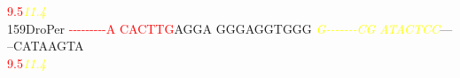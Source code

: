 \documentclass[11pt,twoside,reqno,a4paper]{article}
\begin{document}
{\hspace*{4\charwidth}\hspace*{7\charwidth}\hspace*{0\charwidth}\textcolor{red}{9.5}\hspace*{1\charwidth}\hspace*{1\charwidth}\hspace*{1\charwidth}\hspace*{27\charwidth}\textit{\textcolor{yellow}{11.4}}\hspace*{1\charwidth}\hspace*{1\charwidth}\hspace*{1\charwidth}\\
159\hspace*{1\charwidth}DroPer	\textcolor{red}{-}\textcolor{red}{-}\textcolor{red}{-}\textcolor{red}{-}\textcolor{red}{-}\textcolor{red}{-}\textcolor{red}{-}\textcolor{red}{-}\textcolor{red}{-}\textcolor{red}{A}	\textcolor{red}{C}\textcolor{red}{A}\textcolor{red}{C}\textcolor{red}{T}\textcolor{red}{T}\textcolor{red}{G}AGGA	GGGAGGTGGG	\textit{\textcolor{yellow}{G}}\textit{\textcolor{yellow}{-}}\textit{\textcolor{yellow}{-}}\textit{\textcolor{yellow}{-}}\textit{\textcolor{yellow}{-}}\textit{\textcolor{yellow}{-}}\textit{\textcolor{yellow}{-}}\textit{\textcolor{yellow}{-}}\textit{\textcolor{yellow}{C}}\textit{\textcolor{yellow}{G}}	\textit{\textcolor{yellow}{A}}\textit{\textcolor{yellow}{T}}\textit{\textcolor{yellow}{A}}\textit{\textcolor{yellow}{C}}\textit{\textcolor{yellow}{T}}\textit{\textcolor{yellow}{C}}\textit{\textcolor{yellow}{C}}---	--CATAAGTA	\\
\hspace*{4\charwidth}\hspace*{7\charwidth}\hspace*{0\charwidth}\textcolor{red}{9.5}\hspace*{1\charwidth}\hspace*{1\charwidth}\hspace*{1\charwidth}\hspace*{27\charwidth}\textit{\textcolor{yellow}{11.4}}\hspace*{1\charwidth}\hspace*{1\charwidth}\hspace*{1\charwidth}\\
}
\end{document}
